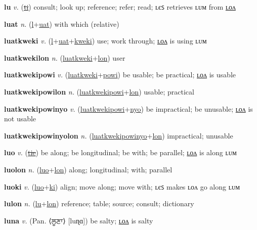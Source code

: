 \textbf{\hypertarget{lu}{lu}} \textit{v.} (\hyperlink{ti}{\sout{ti}})
consult; look up; reference; refer; read; ʟєꜱ retrieves ʟᴜᴍ from \hyperlink{lulon}{ʟᴏᴧ}

\textbf{\hypertarget{luat}{luat}} \textit{n.} (\hyperlink{l}{l}+\allowbreak \hyperlink{uat}{uat})
with which (relative)

\textbf{\hypertarget{luatkweki}{luatkweki}} \textit{v.} (\hyperlink{l}{l}+\allowbreak \hyperlink{uat}{uat}+\allowbreak \hyperlink{kweki}{kweki})
use; work through; \hyperlink{luatkwekilon}{ʟᴏᴧ} is using ʟᴜᴍ

\textbf{\hypertarget{luatkwekilon}{luatkwekilon}} \textit{n.} (\hyperlink{luatkweki}{luatkweki}+\allowbreak \hyperlink{lon}{lon})
user

\textbf{\hypertarget{luatkwekipowi}{luatkwekipowi}} \textit{v.} (\hyperlink{luatkweki}{luatkweki}+\allowbreak \hyperlink{powi}{powi})
be usable; be practical; \hyperlink{luatkwekipowilon}{ʟᴏᴧ} is usable

\textbf{\hypertarget{luatkwekipowilon}{luatkwekipowilon}} \textit{n.} (\hyperlink{luatkwekipowi}{luatkwekipowi}+\allowbreak \hyperlink{lon}{lon})
usable; practical

\textbf{\hypertarget{luatkwekipowinyo}{luatkwekipowinyo}} \textit{v.} (\hyperlink{luatkwekipowi}{luatkwekipowi}+\allowbreak \hyperlink{nyo}{nyo})
be impractical; be unusable; \hyperlink{luatkwekipowinyolon}{ʟᴏᴧ} is not usable

\textbf{\hypertarget{luatkwekipowinyolon}{luatkwekipowinyolon}} \textit{n.} (\hyperlink{luatkwekipowinyo}{luatkwekipowinyo}+\allowbreak \hyperlink{lon}{lon})
impractical; unusable

\textbf{\hypertarget{luo}{luo}} \textit{v.} (\hyperlink{tie}{\sout{tie}})
be along; be longitudinal; be with; be parallel; \hyperlink{luolon}{ʟᴏᴧ} is along ʟᴜᴍ

\textbf{\hypertarget{luolon}{luolon}} \textit{n.} (\hyperlink{luo}{luo}+\allowbreak \hyperlink{lon}{lon})
along; longitudinal; with; parallel

\textbf{\hypertarget{luoki}{luoki}} \textit{v.} (\hyperlink{luo}{luo}+\allowbreak \hyperlink{ki}{ki})
align; move along; move with; ʟєꜱ makes ʟᴏᴧ go along ʟᴜᴍ

\textbf{\hypertarget{lulon}{lulon}} \textit{n.} (\hyperlink{lu}{lu}+\allowbreak \hyperlink{lon}{lon})
reference; table; source; consult; dictionary

\textbf{\hypertarget{luna}{luna}} \textit{v.} (Pan. ⟨{\gurmukhi{}ਲੂਣਾ}⟩ [luɳɑ])
be salty; \hyperlink{lunalon}{ʟᴏᴧ} is salty

